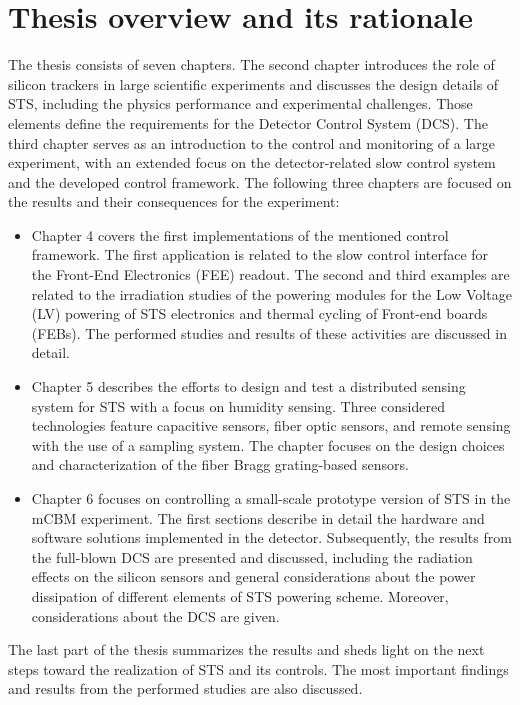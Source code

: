 \section{Thesis overview and its rationale}
The thesis consists of seven chapters. The second chapter introduces the role of silicon trackers in large scientific experiments and discusses the design details of \gls{STS}, including the physics performance and experimental challenges. Those elements define the requirements for the Detector Control System (\gls{DCS}). The third chapter serves as an introduction to the control and monitoring of a large experiment, with an extended focus on the detector-related slow control system and the developed control framework. The following three chapters are focused on the results and their consequences for the experiment:
\begin{itemize}
    \item Chapter 4 covers the first implementations of the mentioned control framework. The first application is related to the slow control interface for the Front-End Electronics (\gls{FEE}) readout. The second and third examples are related to the irradiation studies of the powering modules for the Low Voltage (\gls{LV}) powering of \gls{STS} electronics and thermal cycling of Front-end boards (\glspl{FEB}). The performed studies and results of these activities are discussed in detail.
    \item Chapter 5 describes the efforts to design and test a distributed sensing system for \gls{STS} with a focus on humidity sensing. Three considered technologies feature capacitive sensors, fiber optic sensors, and remote sensing with the use of a sampling system. The chapter focuses on the design choices and characterization of the fiber Bragg grating-based sensors. 
    \item Chapter 6 focuses on controlling a small-scale prototype version of \gls{STS} in the \gls{mCBM} experiment. The first sections describe in detail the hardware and software solutions implemented in the detector. Subsequently, the results from the full-blown \gls{DCS} are presented and discussed, including the radiation effects on the silicon sensors and general considerations about the power dissipation of different elements of \gls{STS} powering scheme. Moreover, considerations about the \gls{DCS} are given. 
\end{itemize}
The last part of the thesis summarizes the results and sheds light on the next steps toward the realization of \gls{STS} and its controls. The most important findings and results from the performed studies are also discussed.